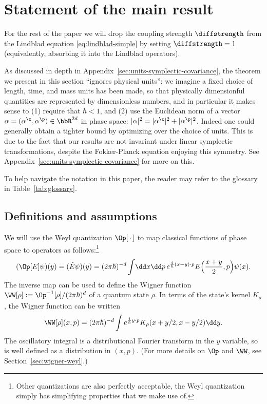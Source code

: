 \documentclass{article}
\numberwithin{equation}{section}
\begin{document}
	











\section{Statement of the main result}
\label{sec:main-result}

For the rest of the paper we will drop the coupling strength $\diffstrength$ from the Lindblad equation \eqref{eq:lindblad-simple} by setting $\diffstrength=1$ (equivalently, absorbing it into the Lindblad operators).  

As discussed in depth in Appendix~\ref{sec:units-symplectic-covariance}, the theorem we present in this section  ``ignores physical units'': we imagine a fixed choice of length, time, and mass units has been made, so that physically dimensionful quantities are represented by dimensionless numbers, and in particular it makes sense to (1) require that $\hbar<1$, and (2) use the Euclidean norm of a vector $\alpha = (\alpha^\x,\alpha^\p)\in\bbR^{2d}$ in phase space: $|\alpha|^2 = |\alpha^\x|^2+|\alpha^\p|^2$.  
Indeed one could generally obtain a tighter bound by optimizing over the choice of units.  This is due to the fact that our results are not invariant under linear symplectic transformations, despite the Fokker-Planck equation enjoying this symmetry. See Appendix~\ref{sec:units-symplectic-covariance} for more on this.

To help navigate the notation in this paper, the reader may refer to the glossary in Table~\ref{tab:glossary}.

\subsection{Definitions and assumptions}\label{sec:definitions-and-assumptions}

We will use the Weyl quantization $\Op[\,\cdot\,]$ to map classical functions of phase space to operators as follows:\footnote{Other quantizations are also perfectly acceptable, the Weyl quantization simply has simplifying properties that we make use of.}
\begin{align}
\label{eq:weyl-op-action-def-intro}
(\Op[E]\psi)(y) = (\hat{E}\psi)(y) =
(2\pi \hbar)^{-d}
\int \! \dd x \dd p\, e^{\frac{i}{\hbar} (x-y)\cdot p}
E\Big(\frac{x+y}{2},p\Big) \psi(x).
\end{align}
The inverse map can be used to define the Wigner function $\WW[\rho]:=\Op^{-1}[\rho]/(2\pi\hbar)^d$ of a quantum state $\rho$.  In terms of the state's kernel $K_{\rho}$, the Wigner function can be written
\begin{align}
\label{eq:wigner-weyl-kernel-def-intro}
\WW[\rho](x,p) = 
(2\pi \hbar)^{-d} \int e^{\frac{i}{\hbar} y\cdot p} K_{\rho}(x+y/2,x-y/2) \dd y.
\end{align}
The oscillatory integral is a distributional Fourier 
 transform in the $y$ variable, so is well defined as a distribution in $(x,p)$. (For more details on $\Op$ and $\WW$, see Section~\ref{sec:wigner-weyl}.)
\end{document}
